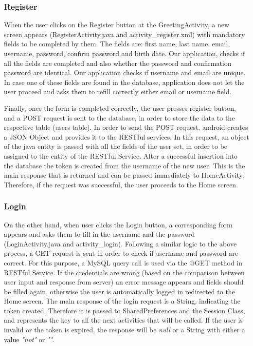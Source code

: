 \documentclass[12pt]{article}
\begin{document}
	\subsubsection{Register}
	When the user clicks on the Register button at the GreetingActivity, a new screen appears (RegisterActivity.java and activity\_register.xml) with mandatory fields to be completed by them. The fields are: first name, last name, email, username, password, confirm password and birth date. Our application, checks if all the fields are completed and also whether the password and confirmation password are identical. Our application checks if username and email are unique. In case one of these fields are found in the database, application does not let the user proceed and asks them to refill correctly either email or username field. 
	
	Finally, once the form is completed correctly, the user presses register button, and a POST request is sent to the database, in order to store the data to the respective table (users table). In order to send the POST request, android creates a JSON Object and provides it to the RESTful services. In this request, an object of the java entity is passed with all the fields of the user set, in order to be assigned to the entity of the RESTful Service. After a successful insertion into the database the token is created from the username of the new user. This is the main response that is returned and can be passed immediately to HomeActivity. Therefore, if the request was successful, the user proceeds to the Home screen.
	
	\subsubsection{Login}
	On the other hand, when user clicks the Login button, a corresponding form appears and asks them to fill in the username and the password (LoginActivity.java and activity\_login). Following a similar logic to the above process, a GET request is sent in order to check if username and password are correct. For this purpose, a MySQL query call is used via the @GET method in RESTful Service. If the credentials are wrong (based on the comparison between user input and response from server) an error message appears and fields should be filled again, otherwise the user is automatically logged in redirected to the Home screen. The main response of the login request is a String, indicating the token created. Therefore it is passed to SharedPreferences and the Session Class, and represents the key to all the next activities that will be called. If the user is invalid or the token is expired, the response will be \textit{null} or a String with either a value \textit{"not"} or \textit{""}.
	
\end{document}
